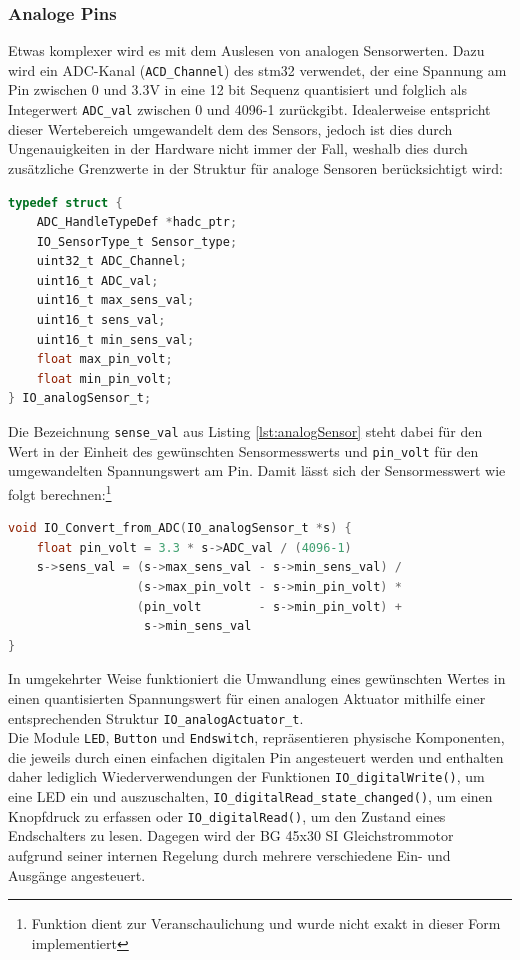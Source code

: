 \subsubsection{Analoge Pins}
Etwas komplexer wird es mit dem Auslesen von analogen Sensorwerten. Dazu wird ein ADC-Kanal (\verb|ACD_Channel|) des stm32 verwendet, der eine Spannung am Pin zwischen 0 und 3.3V in eine 12 bit Sequenz quantisiert und folglich als Integerwert \verb|ADC_val| zwischen 0 und 4096-1 zurückgibt. Idealerweise entspricht dieser Wertebereich umgewandelt dem des Sensors, jedoch ist dies durch Ungenauigkeiten in der Hardware nicht immer der Fall, weshalb dies durch zusätzliche Grenzwerte in der Struktur für analoge Sensoren berücksichtigt wird:
\begin{lstlisting}[language=C, caption={Struktur für analoge Sensoren}, label={lst:analogSensor}]
typedef struct {
	ADC_HandleTypeDef *hadc_ptr;
	IO_SensorType_t Sensor_type;
	uint32_t ADC_Channel;
	uint16_t ADC_val;
	uint16_t max_sens_val;
	uint16_t sens_val;
	uint16_t min_sens_val;
	float max_pin_volt;
	float min_pin_volt;
} IO_analogSensor_t;
\end{lstlisting}
Die Bezeichnung \verb|sense_val| aus Listing \ref{lst:analogSensor} steht dabei für den Wert in der Einheit des gewünschten Sensormesswerts und \verb|pin_volt| für den umgewandelten Spannungswert am Pin. Damit lässt sich der Sensormesswert wie folgt berechnen:\footnote{Funktion dient zur Veranschaulichung und wurde nicht exakt in dieser Form implementiert}
\begin{lstlisting}[language=C, caption={Konvertierung des rohen Analogwerts}, label={analogRead}]
void IO_Convert_from_ADC(IO_analogSensor_t *s) {
	float pin_volt = 3.3 * s->ADC_val / (4096-1)
	s->sens_val = (s->max_sens_val - s->min_sens_val) /
	              (s->max_pin_volt - s->min_pin_volt) *
	              (pin_volt        - s->min_pin_volt) +
	               s->min_sens_val
}
\end{lstlisting}
In umgekehrter Weise funktioniert die Umwandlung eines gewünschten Wertes in einen quantisierten Spannungswert für einen analogen Aktuator mithilfe einer entsprechenden Struktur \verb|IO_analogActuator_t|. \\

\noindent
Die Module \verb|LED|, \verb|Button| und \verb|Endswitch|, repräsentieren physische Komponenten, die jeweils durch einen einfachen digitalen Pin angesteuert werden und enthalten daher lediglich Wiederverwendungen der Funktionen \verb|IO_digitalWrite()|, um eine LED ein und auszuschalten, \verb|IO_digitalRead_state_changed()|, um einen Knopfdruck zu erfassen oder \verb|IO_digitalRead()|, um den Zustand eines Endschalters zu lesen. Dagegen wird der BG 45x30 SI Gleichstrommotor aufgrund seiner internen Regelung durch mehrere verschiedene Ein- und Ausgänge angesteuert.
